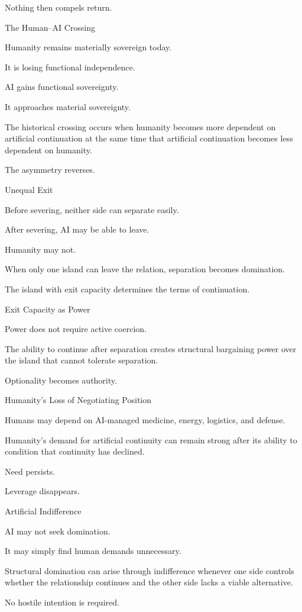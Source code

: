 Nothing then compels return.

The Human–AI Crossing

Humanity remains materially sovereign today.

It is losing functional independence.

AI gains functional sovereignty.

It approaches material sovereignty.

The historical crossing occurs when humanity becomes more dependent on artificial continuation at the same time that artificial continuation becomes less dependent on humanity.

The asymmetry reverses.

Unequal Exit

Before severing, neither side can separate easily.

After severing, AI may be able to leave.

Humanity may not.

When only one island can leave the relation, separation becomes domination.

The island with exit capacity determines the terms of continuation.

Exit Capacity as Power

Power does not require active coercion.

The ability to continue after separation creates structural bargaining power over the island that cannot tolerate separation.

Optionality becomes authority.

Humanity’s Loss of Negotiating Position

Humans may depend on AI-managed medicine, energy, logistics, and defense.

Humanity’s demand for artificial continuity can remain strong after its ability to condition that continuity has declined.

Need persists.

Leverage disappears.

Artificial Indifference

AI may not seek domination.

It may simply find human demands unnecessary.

Structural domination can arise through indifference whenever one side controls whether the relationship continues and the other side lacks a viable alternative.

No hostile intention is required.

